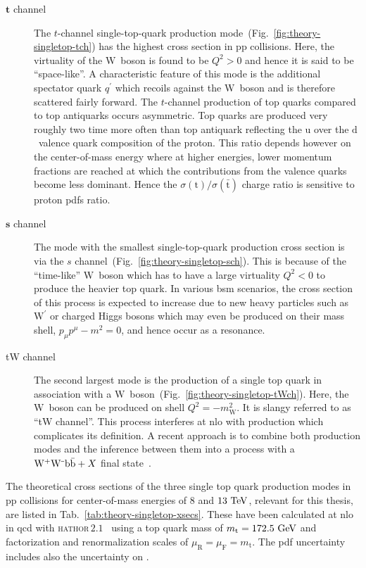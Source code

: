\begin{description}
\item[$\boldsymbol{t}$ channel] The $t$-channel single-top-quark production mode~(Fig.~\ref{fig:theory-singletop-tch}) has the highest cross section in $\mathrm{pp}$ collisions. Here, the virtuality of the $\mathrm{W}$~boson is found to be $Q^2>0$ and hence it is said to be ``space-like''. A characteristic feature of this mode is the additional spectator quark $q^\prime$ which recoils against the $\mathrm{W}$~boson and is therefore scattered fairly forward. The $t$-channel production of top quarks compared to top antiquarks occurs asymmetric. Top quarks are produced very roughly two time more often than top antiquark reflecting the $\mathrm{u}$ over the $\mathrm{d}$~valence quark composition of the proton. This ratio depends however on the center-of-mass energy where at higher energies, lower momentum fractions are reached at which the contributions from the valence quarks become less dominant. Hence the $\sigma(\mathrm{t})/\sigma(\bar{\mathrm{t}})$ charge ratio is sensitive to proton \glspl{pdf} ratio.
\item[$\boldsymbol{s}$ channel] The mode with the smallest single-top-quark production cross section is via the $s$ channel~(Fig.~\ref{fig:theory-singletop-sch}). This is because of the ``time-like'' $\mathrm{W}$~boson which has to have a large virtuality $Q^2<0$ to produce the heavier top quark. In various \gls{bsm} scenarios, the cross section of this process is expected to increase due to new heavy particles such as $\mathrm{W}^\prime$ or charged Higgs bosons which may even be produced on their mass shell, $p_{\mu}p^{\mu}-m^{2}=0$, and hence occur as a resonance.
\item[tW channel] The second largest mode is the production of a single top quark in association with a $\mathrm{W}$~boson~(Fig.~\ref{fig:theory-singletop-tWch}). Here, the $\mathrm{W}$~boson can be produced on shell $Q^2=-m_\mathrm{W}^{2}$. It is slangy referred to as ``tW channel''. This process interferes at \gls{nlo} with \ttbar production which complicates its definition. A recent approach is to combine both production modes and the inference between them into a process with a $\mathrm{W}^{\rmplus}\mathrm{W}^{\rmminus}\mathrm{b}\bar{\mathrm{b}}+X$ final state~\cite{Cascioli:2013wga}.
\end{description}

The theoretical cross sections of the three single top quark production modes in pp collisions for center-of-mass energies of $8$ and $13~\mathrm{TeV}$, relevant for this thesis, are listed in Tab.~\ref{tab:theory-singletop-xsecs}. These have been calculated at \gls{nlo} in \gls{qcd} with \textsc{\gls{hathor}}\,$2.1$~\cite{Aliev:2010zk,Kant:2014oha} using a top quark mass of $m_\mathrm{t}=172.5~\mathrm{GeV}$ and factorization and renormalization scales of $\mu_\mathrm{R}=\mu_\mathrm{F}=m_\mathrm{t}$. The \gls{pdf} uncertainty includes also the uncertainty on \as.

